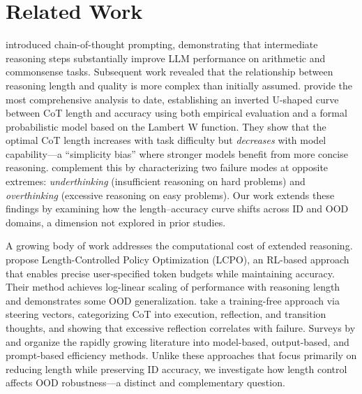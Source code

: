 \section{Related Work}
\label{sec:related}

\citet{wei2022cot} introduced chain-of-thought prompting, demonstrating that intermediate reasoning steps substantially improve LLM performance on arithmetic and commonsense tasks. Subsequent work revealed that the relationship between reasoning length and quality is more complex than initially assumed. \citet{wu2025more} provide the most comprehensive analysis to date, establishing an inverted U-shaped curve between CoT length and accuracy using both empirical evaluation and a formal probabilistic model based on the Lambert W function. They show that the optimal CoT length increases with task difficulty but \emph{decreases} with model capability---a ``simplicity bias'' where stronger models benefit from more concise reasoning. \citet{su2025underthinking} complement this by characterizing two failure modes at opposite extremes: \emph{underthinking} (insufficient reasoning on hard problems) and \emph{overthinking} (excessive reasoning on easy problems). Our work extends these findings by examining how the length--accuracy curve shifts across ID and OOD domains, a dimension not explored in prior studies.

A growing body of work addresses the computational cost of extended reasoning. \citet{aggarwal2025l1} propose Length-Controlled Policy Optimization (LCPO), an RL-based approach that enables precise user-specified token budgets while maintaining accuracy. Their method achieves log-linear scaling of performance with reasoning length and demonstrates some OOD generalization. \citet{chen2025seal} take a training-free approach via steering vectors, categorizing CoT into execution, reflection, and transition thoughts, and showing that excessive reflection correlates with failure. Surveys by \citet{sui2025overthinking} and \citet{yue2025efficient} organize the rapidly growing literature into model-based, output-based, and prompt-based efficiency methods. Unlike these approaches that focus primarily on reducing length while preserving ID accuracy, we investigate how length control affects OOD robustness---a distinct and complementary question.

